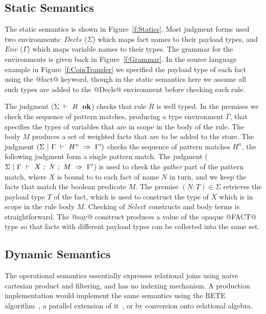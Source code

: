 \clearpage{}


\subsection{Static Semantics}
The static semantics is shown in Figure~\ref{f:Statics}. Most judgment forms used two environments: $Decls$ ($\Sigma$) which maps fact names to their payload types, and $Env$ ($\Gamma$) which maps variable names to their types. The grammar for the environments is given back in Figure~\ref{f:Grammar}. In the source language example in Figure~\ref{f:CoinTransfer} we specified the payload type of each fact using the @fact@ keyword, though in the static semantics here we assume all such types are added to the @Decls@ environment before checking each rule.

The judgment ($\Sigma ~\vdash~ R~~ \textbf{ok}$) checks that rule $R$ is well typed. In the premises we check the sequence of pattern matches, producing a type environment $\Gamma$, that specifies the types of variables that are in scope in the body of the rule. The body $M$ produces a set of weighted facts that are to be added to the store. The judgment $(\Sigma~|~\Gamma~\vdash~H^n~\Rightarrow~\Gamma')$ checks the sequence of pattern matches $H^n$, the following judgment form a single pattern match. The judgment ($\Sigma~|~\Gamma~\vdash~X ~;~ N ~;~ M~\Rightarrow~\Gamma'$) is used to check the \emph{gather} part of the pattern match, where $X$ is bound to to each fact of name $N$ in turn, and we keep the facts that match the boolean predicate $M$. The premise $(N:T) \in \Sigma$ retrieves the payload type $T$ of the fact, which is used to construct the type of $X$ which is in scope in the rule body $M$. Checking of $Select$ constructs and body terms is straightforward. The @say@ construct produces a value of the opaque @FACT@ type so that facts with different payload types can be collected into the same set.


\subsection{Dynamic Semantics}
The operational semantics essentially expresses relational joins using naive cartesian product and filtering, and has no indexing mechanism. A production implementation would implement the same semantics using the RETE algorithm~\cite{Forgy1981:RETE, Doorenbos1995:ProductionMatching}, a parallel extension of it~\cite{Aref1998:LanaMatch}, or by conversion onto relational algebra.

